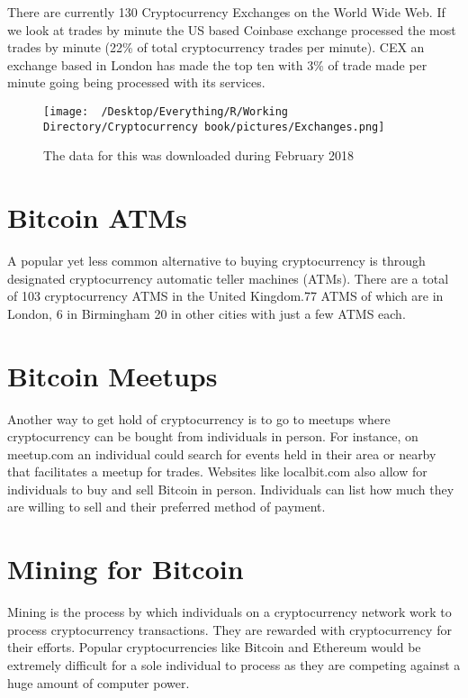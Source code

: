 \documentclass[]{book}
\theoremstyle{definition}
\theoremstyle{definition}
\theoremstyle{definition}
\theoremstyle{remark}
\begin{document}
There are currently 130 Cryptocurrency Exchanges on the World Wide Web.
If we look at trades by minute the US based Coinbase exchange processed
the most trades by minute (22\% of total cryptocurrency trades per
minute). CEX an exchange based in London has made the top ten with 3\%
of trade made per minute going being processed with its services.

\begin{figure}[htbp]
\centering
\texttt{[image: ~/Desktop/Everything/R/Working Directory/Cryptocurrency book/pictures/Exchanges.png]}
\caption{The data for this was downloaded during February 2018}
\end{figure}

\section{Bitcoin ATMs}\label{bitcoin-atms}

A popular yet less common alternative to buying cryptocurrency is
through designated cryptocurrency automatic teller machines (ATMs).
There are a total of 103 cryptocurrency ATMS in the United Kingdom.77
ATMS of which are in London, 6 in Birmingham 20 in other cities with
just a few ATMS each.

\section{Bitcoin Meetups}\label{bitcoin-meetups}

Another way to get hold of cryptocurrency is to go to meetups where
cryptocurrency can be bought from individuals in person. For instance,
on meetup.com an individual could search for events held in their area
or nearby that facilitates a meetup for trades. Websites like
localbit.com also allow for individuals to buy and sell Bitcoin in
person. Individuals can list how much they are willing to sell and their
preferred method of payment.

\section{Mining for Bitcoin}\label{mining-for-bitcoin}

Mining is the process by which individuals on a cryptocurrency network
work to process cryptocurrency transactions. They are rewarded with
cryptocurrency for their efforts. Popular cryptocurrencies like Bitcoin
and Ethereum would be extremely difficult for a sole individual to
process as they are competing against a huge amount of computer power.
\end{document}
